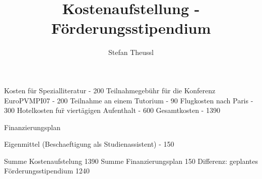 \documentclass[a4paper,fleqn]{article}
\title{Kostenaufstellung - F\"orderungsstipendium}
\author{Stefan Theussl}
\begin{document}
Kosten f\"ur Spezialliteratur - 200
Teilnahmegeb\"uhr f\"ur die Konferenz EuroPVMPI07 - 200
Teilnahme an einem Tutorium - 90
Flugkosten nach Paris - 300
Hotelkosten fu\"r viert\"agigen Aufenthalt - 600
Gesamtkosten - 1390


Finanzierungsplan

Eigenmittel (Beschaeftigung als Studienassistent) - 150

Summe Kostenaufstelung 1390
Summe Finanzierungsplan 150
Differenz: geplantes F\"orderungsstipendium 1240
\end{document}
